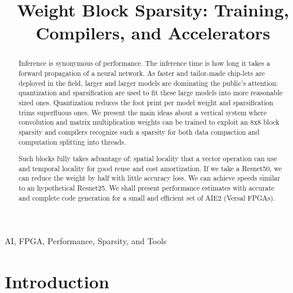 \documentclass[conference]{IEEEtran}
\begin{document}
\title{Weight Block Sparsity: Training, Compilers, and Accelerators  }

\author{
  \and
  \and
  \and
  \and
  \and
  \and
  \and
}

\maketitle

\begin{abstract}
Inference is synonymous of performance. The inference time is how long
it takes a forward propagation of a neural network.  As faster and
tailor-made chip-lets are deployed in the field, larger and larger
models are dominating the public's attention: quantization and
sparsification are used to fit these large models into more reasonable
sized ones. Quantization reduces the foot print per model weight and
sparsification trims superfluous ones.  We present the main ideas
about a vertical system where convolution and matrix multiplication
weights can be trained to exploit an 8x8 block sparsity and compilers
recognize such a sparsity for both data compaction and computation
splitting into threads.

Such blocks fully takes advantage of: spatial locality that a vector
operation can use and temporal locality for good reuse and cost
amortization. If we take a Resnet50, we can reduce the weight by half
with little accuracy loss. We can achieve speeds similar to an
hypothetical Resnet25. We shall present performance estimates with
accurate and complete code generation for a small and efficient set of
AIE2 (Versal FPGAs).
\end{abstract}


\begin{IEEEkeywords}
 AI, FPGA, Performance, Sparsity, and Tools
\end{IEEEkeywords}

\section{Introduction}
\label{sec:introduction}
\end{document}

